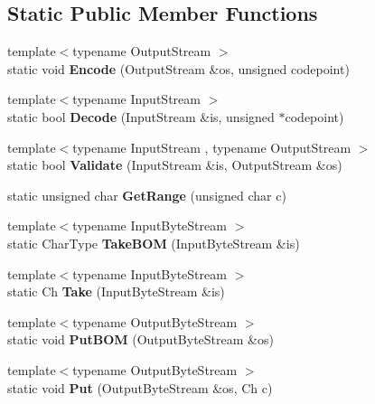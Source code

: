 \subsection*{Static Public Member Functions}
\begin{DoxyCompactItemize}
\item 
{\footnotesize template$<$typename Output\+Stream $>$ }\\static void {\bfseries Encode} (Output\+Stream \&os, unsigned codepoint)\hypertarget{struct_u_t_f8_af286ed19ca60d261a9b11b65bee1298b}{}\label{struct_u_t_f8_af286ed19ca60d261a9b11b65bee1298b}

\item 
{\footnotesize template$<$typename Input\+Stream $>$ }\\static bool {\bfseries Decode} (Input\+Stream \&is, unsigned $\ast$codepoint)\hypertarget{struct_u_t_f8_a17c6badb31acf4f784111c886737fb17}{}\label{struct_u_t_f8_a17c6badb31acf4f784111c886737fb17}

\item 
{\footnotesize template$<$typename Input\+Stream , typename Output\+Stream $>$ }\\static bool {\bfseries Validate} (Input\+Stream \&is, Output\+Stream \&os)\hypertarget{struct_u_t_f8_a9e2e7e37d819baeb5e643654c6e61e33}{}\label{struct_u_t_f8_a9e2e7e37d819baeb5e643654c6e61e33}

\item 
static unsigned char {\bfseries Get\+Range} (unsigned char c)\hypertarget{struct_u_t_f8_ac06bbf38df41adb0c7b9eaa93f85cc38}{}\label{struct_u_t_f8_ac06bbf38df41adb0c7b9eaa93f85cc38}

\item 
{\footnotesize template$<$typename Input\+Byte\+Stream $>$ }\\static Char\+Type {\bfseries Take\+B\+OM} (Input\+Byte\+Stream \&is)\hypertarget{struct_u_t_f8_a1b2359d6ea50ae32fefc9b28e9878a31}{}\label{struct_u_t_f8_a1b2359d6ea50ae32fefc9b28e9878a31}

\item 
{\footnotesize template$<$typename Input\+Byte\+Stream $>$ }\\static Ch {\bfseries Take} (Input\+Byte\+Stream \&is)\hypertarget{struct_u_t_f8_a5b2561a5031c8a699e593cd51b2c6864}{}\label{struct_u_t_f8_a5b2561a5031c8a699e593cd51b2c6864}

\item 
{\footnotesize template$<$typename Output\+Byte\+Stream $>$ }\\static void {\bfseries Put\+B\+OM} (Output\+Byte\+Stream \&os)\hypertarget{struct_u_t_f8_a6b171e5f0662ad81d498875bbdbc536a}{}\label{struct_u_t_f8_a6b171e5f0662ad81d498875bbdbc536a}

\item 
{\footnotesize template$<$typename Output\+Byte\+Stream $>$ }\\static void {\bfseries Put} (Output\+Byte\+Stream \&os, Ch c)\hypertarget{struct_u_t_f8_ab24c23227413798e9be28a21eb26fe51}{}\label{struct_u_t_f8_ab24c23227413798e9be28a21eb26fe51}

\end{DoxyCompactItemize}


